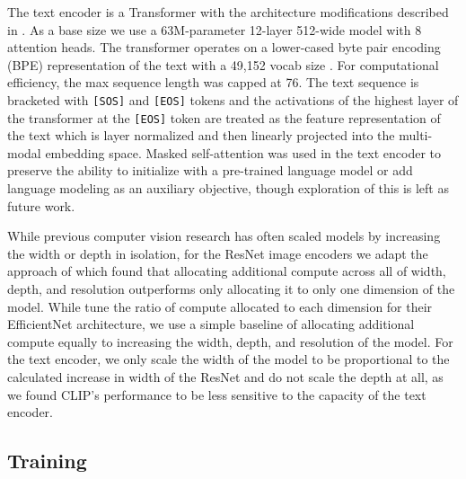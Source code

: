\documentclass{article}
\begin{document}
The text encoder is a Transformer \citep{vaswani2017attention} with the architecture modifications described in \citet{radford2019language}. As a base size we use a 63M-parameter 12-layer 512-wide model with 8 attention heads. The transformer operates on a lower-cased byte pair encoding (BPE) representation of the text with a 49,152 vocab size \citep{sennrich2015neural}. For computational efficiency, the max sequence length was capped at 76. The text sequence is bracketed with \texttt{[SOS]} and \texttt{[EOS]} tokens and the activations of the highest layer of the transformer at the \texttt{[EOS]} token are treated as the feature representation of the text which is layer normalized and then linearly projected into the multi-modal embedding space. Masked self-attention was used in the text encoder to preserve the ability to initialize with a pre-trained language model or add language modeling as an auxiliary objective, though exploration of this is left as future work.



While previous computer vision research has often scaled models by increasing the width \citep{mahajan2018exploring} or depth \citep{he2016deep} in isolation, for the ResNet image encoders we adapt the approach of \citet{tan2019efficientnet} which found that allocating additional compute across all of width, depth, and resolution outperforms only allocating it to only one dimension of the model. While \citet{tan2019efficientnet} tune the ratio of compute allocated to each dimension for their EfficientNet architecture, we use a simple baseline of allocating additional compute equally to increasing the width, depth, and resolution of the model. For the text encoder, we only scale the width of the model to be proportional to the calculated increase in width of the ResNet and do not scale the depth at all, as we found CLIP's performance to be less sensitive to the capacity of the text encoder.












\subsection{Training}
\end{document}
